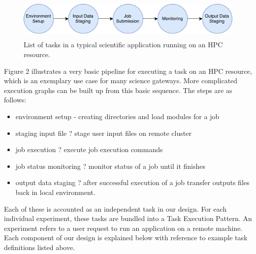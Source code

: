 \documentclass[review]{elsarticle}
\begin{document}
\begin{figure}
\includegraphics[height=0.8in, width=4.8 in]{figures/figure2.pdf}
\caption{List of tasks in a typical scientific application running on an HPC resource.}
\end{figure}

Figure 2 illustrates a very basic pipeline for executing a task on an HPC resource, which is an exemplary use case for many science gateways.  More complicated execution graphs can be built up from this basic sequence. The steps are as follows:
\begin{itemize}
\item environment setup - creating directories and load modules for a job
\item staging input file ? stage user input files on remote cluster
\item job execution ? execute job execution commands
\item job status monitoring ? monitor status of a job until it finishes
\item output data staging ? after successful execution of a job transfer outputs files back in local environment.
\end{itemize}
Each of these is accounted as an independent task in our design. For each individual experiment, these tasks are bundled into a Task Execution Pattern. An experiment refers to a user request to run an application on a remote machine. Each component of our design is explained below with reference to example task definitions listed above.
\end{document}
